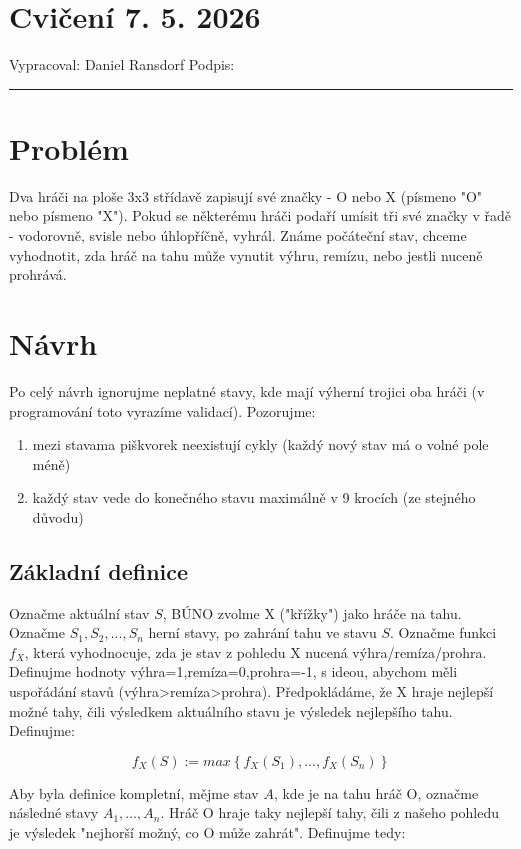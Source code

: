 \documentclass[12pt]{article}
\begin{document}
\section*{Cvičení 7. 5. 2026}

Vypracoval: Daniel Ransdorf \hfill Podpis: \rule{4cm}{0.4pt}


\bigskip

\section{Problém}
Dva hráči na ploše 3x3 střídavě zapisují své značky - O nebo X (písmeno "O" nebo písmeno "X"). Pokud se některému hráči podaří umísit tři své značky v řadě - vodorovně, svisle nebo úhlopříčně, vyhrál. Známe počáteční stav, chceme vyhodnotit, zda hráč na tahu může vynutit výhru, remízu, nebo jestli nuceně prohrává.
\section{Návrh}
Po celý návrh ignorujme neplatné stavy, kde mají výherní trojici oba hráči (v programování toto vyrazíme validací).
Pozorujme:
\begin{enumerate}
  \item mezi stavama piškvorek neexistují cykly (každý nový stav má o volné pole méně)
  \item každý stav vede do konečného stavu maximálně v 9 krocích (ze stejného důvodu)
\end{enumerate}

\subsection{Základní definice}

Označme aktuální stav $S$, BÚNO zvolme X ("křížky") jako hráče na tahu. Označme $S_1,S_2,...,S_n$ herní stavy, po zahrání tahu ve stavu $S$.
Označme funkci $f_X$, která vyhodnocuje, zda je stav z pohledu X nucená výhra/remíza/prohra. Definujme hodnoty výhra=1,remíza=0,prohra=-1,
s ideou, abychom měli uspořádání stavů (výhra>remíza>prohra).
Předpokládáme, že X hraje nejlepší možné tahy, čili výsledkem aktuálního stavu je výsledek nejlepšího tahu. Definujme:

\[
  f_X(S) := max\left\{ f_X(S_1),...,f_X(S_n) \right\}
\]

Aby byla definice kompletní, mějme stav $A$, kde je na tahu hráč O, označme následné stavy $A_1,...,A_n$.
Hráč O hraje taky nejlepší tahy, čili z našeho pohledu je výsledek "nejhorší možný, co O může zahrát".
Definujme tedy:
\end{document}
